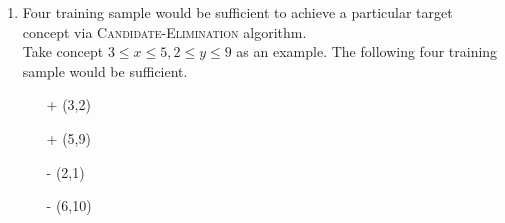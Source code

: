 \documentclass[10pt]{article}
\theoremstyle{definition}
\begin{document}
\begin{enumerate}
    \item Four training sample would be sufficient to achieve a particular
        target concept via \textsc{Candidate-Elimination} algorithm.\\
        Take concept $3 \leq x \leq 5 , 2 \leq y \leq 9$ as an example. The
        following four training sample would be sufficient.
        \begin{itemize}
            \item[+] (3,2)
            \item[+] (5,9)
            \item[-] (2,1)
            \item[-] (6,10)
        \end{itemize}
\end{enumerate}
\section{}
\end{document}
